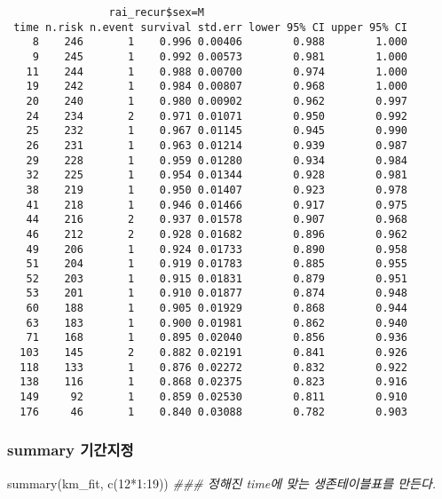 \documentclass[
  letterpaper,
  DIV=11,
  numbers=noendperiod]{scrartcl}
\newenvironment{Shaded}{\begin{snugshade}}{\end{snugshade}}
\newcommand{\DecValTok}[1]{\textcolor[rgb]{0.68,0.00,0.00}{#1}}
\newcommand{\DocumentationTok}[1]{\textcolor[rgb]{0.37,0.37,0.37}{\textit{#1}}}
\newcommand{\FunctionTok}[1]{\textcolor[rgb]{0.28,0.35,0.67}{#1}}
\newcommand{\NormalTok}[1]{\textcolor[rgb]{0.00,0.23,0.31}{#1}}
\newcommand{\SpecialCharTok}[1]{\textcolor[rgb]{0.37,0.37,0.37}{#1}}
\begin{document}
\begin{verbatim}
                rai_recur$sex=M 
 time n.risk n.event survival std.err lower 95% CI upper 95% CI
    8    246       1    0.996 0.00406        0.988        1.000
    9    245       1    0.992 0.00573        0.981        1.000
   11    244       1    0.988 0.00700        0.974        1.000
   19    242       1    0.984 0.00807        0.968        1.000
   20    240       1    0.980 0.00902        0.962        0.997
   24    234       2    0.971 0.01071        0.950        0.992
   25    232       1    0.967 0.01145        0.945        0.990
   26    231       1    0.963 0.01214        0.939        0.987
   29    228       1    0.959 0.01280        0.934        0.984
   32    225       1    0.954 0.01344        0.928        0.981
   38    219       1    0.950 0.01407        0.923        0.978
   41    218       1    0.946 0.01466        0.917        0.975
   44    216       2    0.937 0.01578        0.907        0.968
   46    212       2    0.928 0.01682        0.896        0.962
   49    206       1    0.924 0.01733        0.890        0.958
   51    204       1    0.919 0.01783        0.885        0.955
   52    203       1    0.915 0.01831        0.879        0.951
   53    201       1    0.910 0.01877        0.874        0.948
   60    188       1    0.905 0.01929        0.868        0.944
   63    183       1    0.900 0.01981        0.862        0.940
   71    168       1    0.895 0.02040        0.856        0.936
  103    145       2    0.882 0.02191        0.841        0.926
  118    133       1    0.876 0.02272        0.832        0.922
  138    116       1    0.868 0.02375        0.823        0.916
  149     92       1    0.859 0.02530        0.811        0.910
  176     46       1    0.840 0.03088        0.782        0.903
\end{verbatim}

\subsubsection{summary 기간지정}\label{summary-uxae30uxac04uxc9c0uxc815}

\begin{Shaded}
\begin{Highlighting}[]
\FunctionTok{summary}\NormalTok{(km\_fit, }\FunctionTok{c}\NormalTok{(}\DecValTok{12}\SpecialCharTok{*}\DecValTok{1}\SpecialCharTok{:}\DecValTok{19}\NormalTok{)) }\DocumentationTok{\#\#\# 정해진 time에 맞는 생존테이블표를 만든다.}
\end{Highlighting}
\end{Shaded}
\end{document}
